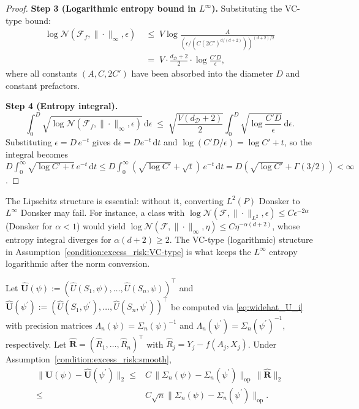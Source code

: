 \begin{proof}
\noindent\textbf{Step 3 (Logarithmic entropy bound in $L^\infty$).}
Substituting the VC-type bound:
\begin{align*}
\log\mathcal{N}(\mathcal{F}_f,\|\cdot\|_\infty,\epsilon)
&\;\leq\; V\log\frac{A}{(\epsilon/(C(2C')^{d/(d+2)}))^{(d+2)/2}}\\
&\;=\; V\cdot\frac{d_{\mathcal{D}}+2}{2}\cdot\log\frac{C'D}{\epsilon},
\end{align*}
where all constants $(A, C, 2C')$ have been absorbed into the diameter $D$ and constant prefactors.

\noindent\textbf{Step 4 (Entropy integral).}
\[
\int_0^D\sqrt{\log\mathcal{N}(\mathcal{F}_f,\|\cdot\|_\infty,\epsilon)}\,\mathrm{d}\epsilon
\;\leq\; \sqrt{\frac{V(d_{\mathcal{D}}+2)}{2}}\int_0^D\sqrt{\log\frac{C'D}{\epsilon}}\,\mathrm{d}\epsilon.
\]
Substituting $\epsilon = D\,e^{-t}$ gives $\mathrm{d}\epsilon = D e^{-t}\,\mathrm{d}t$ and $\log(C'D/\epsilon) = \log C' + t$, so the integral becomes $D\int_0^\infty\sqrt{\log C'+t}\,e^{-t}\,\mathrm{d}t \leq D\int_0^\infty(\sqrt{\log C'}+\sqrt{t})\,e^{-t}\,\mathrm{d}t = D(\sqrt{\log C'} + \Gamma(3/2)) < \infty$.
\end{proof}

\begin{remark}
The Lipschitz structure is essential: without it, converting $L^2(P)$ Donsker to $L^\infty$ Donsker may fail. For instance, a class with $\log\mathcal{N}(\mathcal{F},\|\cdot\|_{L^2},\epsilon)\leq C\epsilon^{-2\alpha}$ (Donsker for $\alpha<1$) would yield $\log\mathcal{N}(\mathcal{F},\|\cdot\|_\infty,\eta)\leq C\eta^{-\alpha(d+2)}$, whose entropy integral diverges for $\alpha(d+2)\geq 2$. The VC-type (logarithmic) structure in Assumption~\ref{condition:excess_risk:VC-type} is what keeps the $L^\infty$ entropy logarithmic after the norm conversion.
\end{remark}

\begin{lemma}\label{lemma:widehat_U_diff_psi_L2}
Let $\widehat{\mathbf{U}}(\psi):=(\widehat{U}(S_1,\psi),\ldots,\widehat{U}(S_n,\psi))^\top$ and $\widehat{\mathbf{U}}(\psi^\prime):=(\widehat{U}(S_1,\psi^\prime),\ldots,\widehat{U}(S_n,\psi^\prime))^\top$ be computed via \eqref{eq:widehat_U_i} with precision matrices $\Lambda_n(\psi)=\Sigma_n(\psi)^{-1}$ and $\Lambda_n(\psi^\prime)=\Sigma_n(\psi^\prime)^{-1}$, respectively. Let $\widehat{\mathbf{R}}=(\widehat{R}_1,\ldots,\widehat{R}_n)^\top$ with $\widehat{R}_j=Y_j-f(A_j,X_j)$.  Under Assumption~\ref{condition:excess_risk:smooth},
\begin{align*}
\|\widehat{\mathbf{U}}(\psi)-\widehat{\mathbf{U}}(\psi^\prime)\|_2
\leq & C\,\|\Sigma_n(\psi)-\Sigma_n(\psi^\prime)\|_{\mathrm{op}}\,\|\widehat{\mathbf{R}}\|_2\\
\leq & C\sqrt{n}\|\Sigma_n(\psi)-\Sigma_n(\psi^\prime)\|_{\mathrm{op}}.
\end{align*}
\end{lemma}

